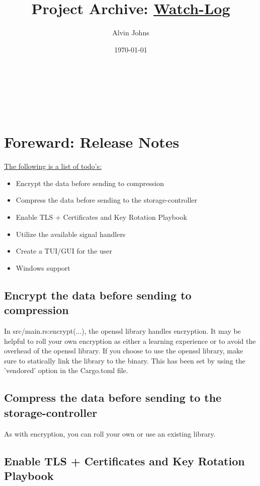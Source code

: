 \documentclass{article}
\title{Project Archive: \underline{Watch-Log}}
\author{Alvin Johns}
\date{\today}
\makeatletter
\renewcommand{\maketitle}{
    \begin{titlepage}
        \centering
        \vspace*{\fill}
        \large \textbf{\@title} \\
        \vspace{0.5cm}
        \normalsize \textbf{\@author}\\
        \vspace{0.5cm}
        \normalsize \textbf{\@date} \\
        \vspace*{\fill}
    \end{titlepage}
}
\makeatother
\begin{document}
\maketitle

\newpage

\tableofcontents

\newpage

\raggedright

\section{Foreward: Release Notes}

\underline{The following is a list of todo's:}

\begin{itemize}[label=+]
    \item{Encrypt the data before sending to compression}
    \item{Compress the data before sending to the storage-controller}
    \item{Enable TLS + Certificates and Key Rotation Playbook}
    \item{Utilize the available signal handlers}
    \item{Create a TUI/GUI for the user}
    \item{Windows support}
\end{itemize}

\subsection{Encrypt the data before sending to compression}

In src/main.rs:encrypt(...), the openssl library handles encryption. It may be helpful to roll your own encryption as either a learning experience or to avoid the overhead of the openssl library. If you choose to use the openssl library, make sure to statically link the library to the binary. This has been set by using the 'vendored' option in the Cargo.toml file.

\subsection{Compress the data before sending to the storage-controller}

As with encryption, you can roll your own or use an existing library.

\subsection{Enable TLS + Certificates and Key Rotation Playbook}
\end{document}
